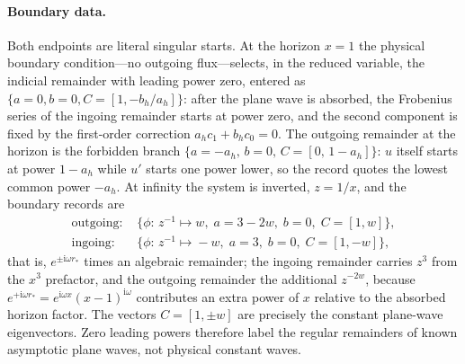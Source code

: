 \documentclass[11pt,a4paper]{article}
\newcommand{\ii}{\mathrm i}
\begin{document}
\paragraph{Boundary data.}
Both endpoints are literal singular starts. At the horizon $x=1$ the physical boundary
condition---no outgoing flux---selects, in the reduced variable, the indicial remainder
with leading power zero, entered as $\{a{=}0,b{=}0,C{=}[1,-b_h/a_h]\}$: after the plane
wave is absorbed, the Frobenius series of the ingoing remainder starts at power zero, and
the second component is fixed by the first-order correction $a_hc_1+b_hc_0=0$. The
outgoing remainder at the horizon is the forbidden branch
$\{a{=}-a_h,\,b{=}0,\,C{=}[0,\,1-a_h]\}$: $u$ itself starts at power $1-a_h$ while $u'$
starts one power lower, so the record quotes the lowest common power $-a_h$. At infinity
the system is inverted, $z=1/x$, and the boundary records are
\begin{align}
  \text{outgoing: }&\{\phi{:}\,z^{-1}\!\mapsto\!w,\; a{=}3-2w,\; b{=}0,\; C{=}[1,w]\},
  \label{eq:qnm-infinity-records}\\
  \text{ingoing: }&\{\phi{:}\,z^{-1}\!\mapsto\!{-}w,\; a{=}3,\; b{=}0,\; C{=}[1,-w]\},
  \nonumber
\end{align}
that is, $e^{\pm\ii\omega r_{*}}$ times an algebraic remainder; the ingoing remainder
carries $z^{3}$ from the $x^{3}$ prefactor, and the outgoing remainder the additional
$z^{-2w}$, because $e^{+\ii\omega r_{*}}=e^{\ii\omega x}(x-1)^{\ii\omega}$ contributes an
extra power of $x$ relative to the absorbed horizon factor. The vectors $C=[1,\pm w]$ are
precisely the constant plane-wave eigenvectors. Zero leading powers therefore label the
regular remainders of known asymptotic plane waves, not physical constant waves.
\end{document}
